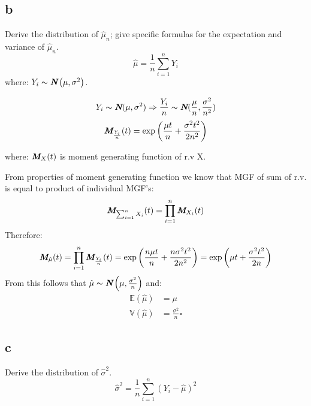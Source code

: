 
\subsection{b} Derive the distribution of $\hat{\mu}_n$; give specific formulas for the expectation and variance of $\hat{\mu}_n$.
\label{section_1_b}
\begin{equation}
\hat{\mu} = \frac{1}{n}\sum_{i=1}^{n}Y_i
\end{equation}
where: $Y_i \thicksim \textbf{\em N}\left(\mu,\sigma^2\right)$.

\begin{equation}
Y_i \thicksim \textbf{\em N}(\mu,\sigma^2) \Rightarrow \frac{Y_i}{n} \thicksim \textbf{\em N}(\frac{\mu}{n},\frac{\sigma^2}{n^2})
\end{equation}
\begin{equation}
\textbf{\em M}_{\frac{Y_i}{n}}(t)=\exp\left(\frac{\mu t}{n} + \frac{\sigma^2 t^2}{2n^2}\right)
\end{equation}

where: $\textbf{\em M}_X(t)$ is moment generating function of r.v X.\\

\begin{solution}
From properties of moment generating function we know that MGF of sum of r.v. is equal to product of individual MGF's:
\begin{equation}
\textbf{\em M}_{\sum_{i=1}^{n}X_i}(t) = \prod_{i=1}^{n}\textbf{\em M}_{X_i}(t)
\label{mom_gen_fun_sum}
\end{equation}
Therefore:
\begin{equation}
\textbf{\em M}_{\hat{\mu}}(t) = \prod_{i=1}^{n}\textbf{\em M}_{\frac{Y_i}{n}}(t) = \exp\left(\frac{n\mu t}{n} + \frac{n\sigma^2 t^2}{2n^2}\right) = \exp\left(\mu t + \frac{\sigma^2 t^2}{2n}\right)
\end{equation}
From this follows that $\hat{\mu} \thicksim \textbf{\em N}\left(\mu,\frac{\sigma^2}{n}\right)$ and:
\begin{equation}
\begin{split}
\mathbb{E}\left(\hat{\mu}\right) & = \mu \\
\mathbb{V}\left(\hat{\mu}\right) & = \frac{\sigma^2}{n}\square
\end{split}
\end{equation}

\end{solution}


\subsection{c} Derive the distribution of $\hat{\sigma}^2$.
\label{section_1_c}
\begin{equation}
\hat{\sigma}^2 = \frac{1}{n}\sum_{i=1}^{n}\left(Y_i - \hat{\mu}\right)^2
\end{equation}

